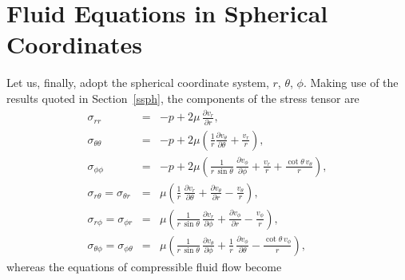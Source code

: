\section{Fluid Equations in Spherical Coordinates}
Let us, finally,  adopt the spherical  coordinate system, $r$, $\theta$, $\phi$. Making use of the results quoted
in Section~\ref{ssph}, the components of the stress tensor are
\begin{eqnarray}
\sigma_{rr} &=&-p + 2\mu\,\frac{\partial v_r}{\partial r},\\[0.5ex]
\sigma_{\theta\theta} &=&-p + 2\mu\left(\frac{1}{r}\frac{\partial v_\theta}{\partial \theta}+ \frac{v_r}{r}\right),\\[0.5ex]
\sigma_{\phi\phi} &=&-p + 2\mu\left(\frac{1}{r\,\sin\theta}\,\frac{\partial v_\phi}{\partial \phi}+\frac{v_r}{r}+\frac{\cot\theta\,v_\theta}{r}\right),\\[0.5ex]
\sigma_{r\theta}=\sigma_{\theta r} &=&\mu\left(\frac{1}{r}\,\frac{\partial v_r}{\partial\theta} + \frac{\partial v_\theta}{\partial r}-\frac{v_\theta}{r}\right),\\[0.5ex]
\sigma_{r\phi}=\sigma_{\phi r} &=&\mu\left(\frac{1}{r\,\sin\theta}\,\frac{\partial v_r}{\partial \phi} + \frac{\partial v_\phi}{\partial r}-\frac{v_\phi}{r}\right),\\[0.5ex]
\sigma_{\theta \phi} = \sigma_{\phi\theta} &=& \mu\left(\frac{1}{r\,\sin\theta}\,\frac{\partial v_\theta}{\partial \phi}+\frac{1}{r}\,\frac{\partial v_\phi}{\partial\theta}-\frac{\cot\theta\,v_\phi}{r}\right),
\end{eqnarray}
whereas the equations of compressible fluid flow become
